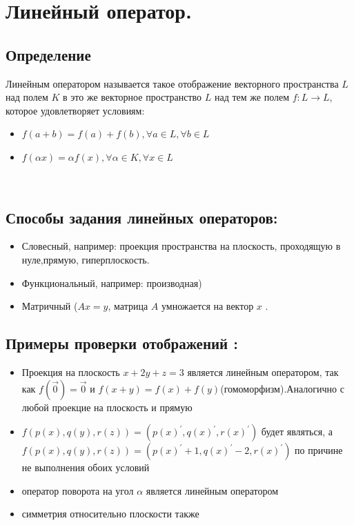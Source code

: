 \documentclass[12pt]{article}
\begin{document}
\section{Линейный оператор.}
\subsection{Определение}
Линейным оператором называется такое отображение векторного пространства $L$ над полем $K$ в это же векторное пространство $L$ над тем же полем $f: L \longrightarrow L $, которое удовлетворяет условиям:
\begin{itemize}
    \item $f(a+b)=f(a)+f(b), \forall a \in L, \forall b \in L$
    \item $f(\alpha x)=\alpha f(x), \forall \alpha \in K, \forall x \in L$
\end{itemize}
\\

\subsection{Способы задания линейных операторов:}
\begin{itemize}
    \item Словесный, например: проекция пространства на плоскость, проходящую в нуле,прямую, гиперплоскость.
    \item Функциональный, например: производная)
    \item Матричный ($Ax=y$, матрица $A$ умножается на вектор $x$  .
\end{itemize}
\subsection{Примеры проверки отображений :}
\begin{itemize}
    \item Проекция на плоскость $x+2y+z=3$ является линейным оператором, так как $f(\overrightarrow{0})= \overrightarrow{0}$ и $f(x+y)=f(x)+f(y)$(гомоморфизм).Аналогично с любой проекцие на плоскость и прямую
    \item $f(p(x),q(y),r(z))=(p(x)^{'},q(x)^{'},r(x)^{'})$ будет являться, а $f(p(x),q(y),r(z))=(p(x)^{'}+1,q(x)^{'}-2,r(x)^{'})$ по причине не выполнения обоих условий
    \item оператор поворота на угол $\alpha $ является линейным оператором
    \item симметрия относительно плоскости также
\end{itemize}
\end{document}
